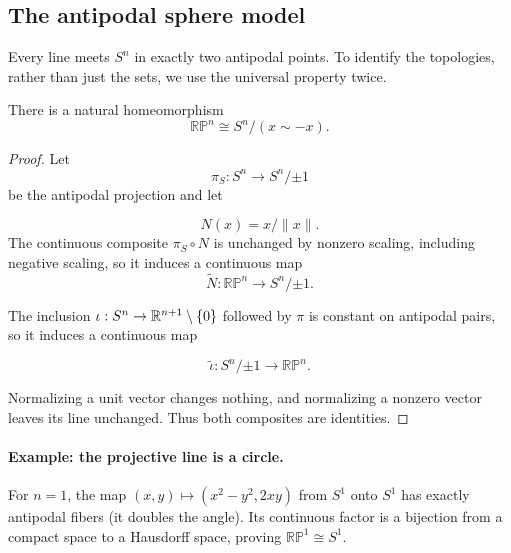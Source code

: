 \subsection{The antipodal sphere model}
Every line meets $S^n$ in exactly two antipodal points. To identify the
topologies, rather than just the sets, we use the universal property twice.
\begin{proposition}
There is a natural homeomorphism
\[
\mathbb{RP}^n\cong S^n/(x\sim-x).
\]

\end{proposition}
\begin{proof}
Let
\[
\pi_S:S^n\to S^n/{\pm1}
\]
 be the antipodal projection and let

\[
N(x)=x/\|x\|.
\]
 The continuous composite $\pi_S\circ N$ is unchanged
by nonzero scaling, including negative scaling, so it induces a continuous
map
\[
\widetilde N:\mathbb{RP}^n\to S^n/{\pm1}.
\]

The inclusion $\iota:S^n\to\mathbb{R}^{n+1}\setminus\{0\}$ followed by $\pi$
is constant on antipodal pairs, so it induces a continuous map

\[
\widetilde\iota:S^n/{\pm1}\to\mathbb{RP}^n.
\]

Normalizing a unit vector changes nothing, and normalizing a nonzero
vector leaves its line unchanged. Thus both composites are identities.
\end{proof}

\FloatBarrier

\paragraph{Example: the projective line is a circle.}
For $n=1$, the map $(x,y)\mapsto(x^2-y^2,2xy)$ from $S^1$ onto $S^1$
has exactly antipodal fibers (it doubles the angle). Its continuous factor
is a bijection from a compact space to a Hausdorff space, proving
$\mathbb{RP}^1\cong S^1$.

